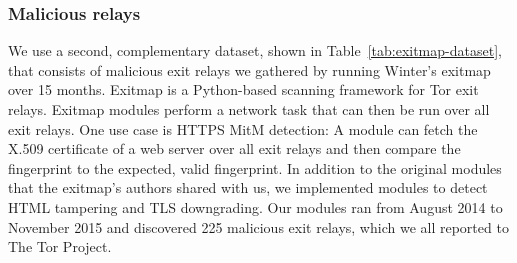 \subsubsection{Malicious relays}
We use a second, complementary dataset, shown in
Table~\ref{tab:exitmap-dataset}, that consists of malicious exit relays we
gathered by running Winter's exitmap~\cite[\S 3.1]{Winter2014a} over 15 months.
Exitmap is a Python-based scanning framework for Tor exit relays.  Exitmap
modules perform a network task that can then be run over all exit relays.  One
use case is HTTPS MitM detection: A module can fetch the X.509 certificate of a
web server over all exit relays and then compare the fingerprint to the
expected, valid fingerprint.  In addition to the original modules that the
exitmap's authors shared with us, we implemented modules to detect HTML
tampering and TLS downgrading.  Our modules ran from August 2014 to November
2015 and discovered 225 malicious exit relays, which we all reported to The Tor
Project.


